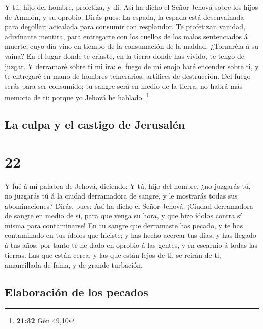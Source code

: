  Y tú, hijo del hombre, profetiza, y di: Así ha dicho el
Señor Jehová sobre los hijos de Ammón, y su oprobio. Dirás pues: La
espada, la espada está desenvainada para degollar; acicalada para
consumir con resplandor.  Te profetizan vanidad,
adivínante mentira, para entregarte con los cuellos de los malos
sentenciados á muerte, cuyo día vino en tiempo de la consumación de la
maldad.  ¿Tornaréla á su vaina? En el lugar donde te
criaste, en la tierra donde has vivido, te tengo de juzgar.
 Y derramaré sobre ti mi ira: el fuego de mi enojo haré
encender sobre ti, y te entregaré en mano de hombres temerarios,
artífices de destrucción.  Del fuego serás para ser
consumido; tu sangre será en medio de la tierra; no habrá más memoria de
ti: porque yo Jehová he hablado. \footnote{\textbf{21:32} Gén 49,10}

\hypertarget{la-culpa-y-el-castigo-de-jerusaluxe9n}{%
\subsection{La culpa y el castigo de
Jerusalén}\label{la-culpa-y-el-castigo-de-jerusaluxe9n}}

\hypertarget{section-21}{%
\section{22}\label{section-21}}

 Y fué á mí palabra de Jehová, diciendo:  Y
tú, hijo del hombre, ¿no juzgarás tú, no juzgarás tú á la ciudad
derramadora de sangre, y le mostrarás todas sus abominaciones?
 Dirás, pues: Así ha dicho el Señor Jehová: ¡Ciudad
derramadora de sangre en medio de sí, para que venga su hora, y que hizo
ídolos contra sí misma para contaminarse!  En tu sangre
que derramaste has pecado, y te has contaminado en tus ídolos que
hiciste; y has hecho acercar tus días, y has llegado á tus años: por
tanto te he dado en oprobio á las gentes, y en escarnio á todas las
tierras.  Las que están cerca, y las que están lejos de
ti, se reirán de ti, amancillada de fama, y de grande turbación.

\hypertarget{elaboraciuxf3n-de-los-pecados}{%
\subsection{Elaboración de los
pecados}\label{elaboraciuxf3n-de-los-pecados}}

